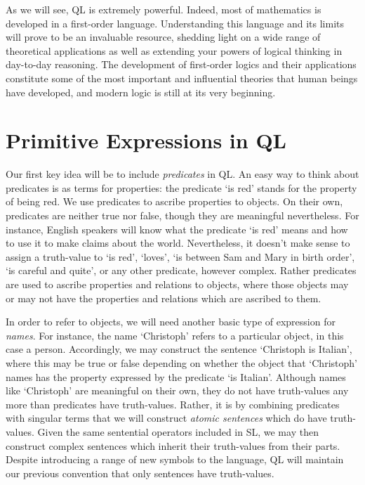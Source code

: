 As we will see, QL is extremely powerful.
Indeed, most of mathematics is developed in a first-order language.
Understanding this language and its limits will prove to be an invaluable resource, shedding light on a wide range of theoretical applications as well as extending your powers of logical thinking in day-to-day reasoning. 
The development of first-order logics and their applications constitute some of the most important and influential theories that human beings have developed, and modern logic is still at its very beginning.





\section{Primitive Expressions in QL}

Our first key idea will be to include \textit{predicates} in QL.
An easy way to think about predicates is as terms for properties: the predicate `is red' stands for the property of being red.
We use predicates to ascribe properties to objects.
On their own, predicates are neither true nor false, though they are meaningful nevertheless.
For instance, English speakers will know what the predicate `is red' means and how to use it to make claims about the world.
Nevertheless, it doesn't make sense to assign a truth-value to `is red', `loves', `is between Sam and Mary in birth order', `is careful and quite', or any other predicate, however complex.
Rather predicates are used to ascribe properties and relations to objects, where those objects may or may not have the properties and relations which are ascribed to them.

In order to refer to objects, we will need another basic type of expression for \textit{names}.
For instance, the name `Christoph' refers to a particular object, in this case a person.
Accordingly, we may construct the sentence `Christoph is Italian', where this may be true or false depending on whether the object that `Christoph' names has the property expressed by the predicate `is Italian'.
Although names like `Christoph' are meaningful on their own, they do not have truth-values any more than predicates have truth-values.
Rather, it is by combining predicates with singular terms that we will construct \textit{atomic sentences} which do have truth-values.
Given the same sentential operators included in SL, we may then construct complex sentences which inherit their truth-values from their parts.
Despite introducing a range of new symbols to the language, QL will maintain our previous convention that only sentences have truth-values.

